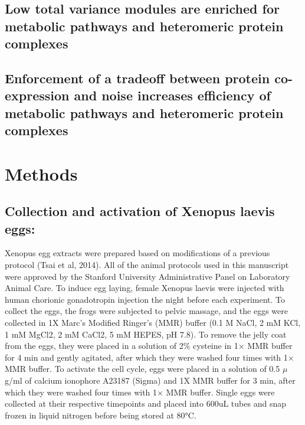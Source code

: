 \documentclass[11pt,]{article}
\begin{document}
\hypertarget{low-total-variance-modules-are-enriched-for-metabolic-pathways-and-heteromeric-protein-complexes}{%
\subsection{Low total variance modules are enriched for metabolic
pathways and heteromeric protein
complexes}\label{low-total-variance-modules-are-enriched-for-metabolic-pathways-and-heteromeric-protein-complexes}}

\hypertarget{enforcement-of-a-tradeoff-between-protein-co-expression-and-noise-increases-efficiency-of-metabolic-pathways-and-heteromeric-protein-complexes}{%
\subsection{Enforcement of a tradeoff between protein co-expression and
noise increases efficiency of metabolic pathways and heteromeric protein
complexes}\label{enforcement-of-a-tradeoff-between-protein-co-expression-and-noise-increases-efficiency-of-metabolic-pathways-and-heteromeric-protein-complexes}}

\hypertarget{methods}{%
\section{Methods}\label{methods}}

\hypertarget{collection-and-activation-of-xenopus-laevis-eggs}{%
\subsection{Collection and activation of Xenopus laevis
eggs:}\label{collection-and-activation-of-xenopus-laevis-eggs}}

Xenopus egg extracts were prepared based on modifications of a previous
protocol (Tsai et al, 2014). All of the animal protocols used in this
manuscript were approved by the Stanford University Administrative Panel
on Laboratory Animal Care. To induce egg laying, female Xenopus laevis
were injected with human chorionic gonadotropin injection the night
before each experiment. To collect the eggs, the frogs were subjected to
pelvic massage, and the eggs were collected in 1X Marc's Modified
Ringer's (MMR) buffer (0.1 M NaCl, 2 mM KCl, 1 mM MgCl2, 2 mM CaCl2, 5
mM HEPES, pH 7.8). To remove the jelly coat from the eggs, they were
placed in a solution of 2\% cysteine in 1× MMR buffer for 4 min and
gently agitated, after which they were washed four times with 1× MMR
buffer. To activate the cell cycle, eggs were placed in a solution of
0.5 \(\mu\)g/ml of calcium ionophore A23187 (Sigma) and 1X MMR buffer
for 3 min, after which they were washed four times with 1× MMR buffer.
Single eggs were collected at their respective timepoints and placed
into 600uL tubes and snap frozen in liquid nitrogen before being stored
at 80°C.
\end{document}
